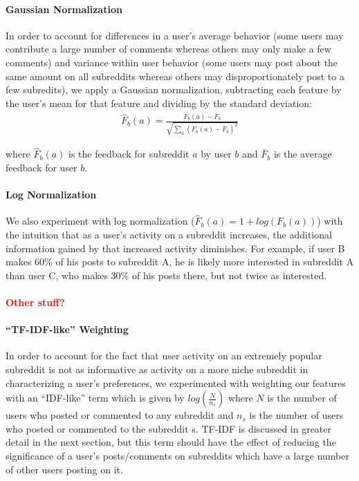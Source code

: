 \documentclass{article}
\begin{document}
\paragraph{Gaussian Normalization} In order to account for differences in a user's average behavior (some users may contribute a large number of comments whereas others may only make a few comments) and variance within user behavior (some users may post about the same amount on all subreddits whereas others may disproportionately post to a few subredits), we apply a Gaussian normalization, subtracting each feature by the user's mean for that feature and dividing by the standard deviation: \begin{align*}
\hat{F}_{b}(a) = \frac{F_{b}(a) - \bar{F}_b}{\sqrt{\sum_{a}{(F_{b}(a) - \bar{F}_b)^2}}}
\end{align*}

where $\hat{F}_{b}(a)$ is the feedback for subreddit $a$ by user $b$ and $\bar{F}_b$ is the average feedback for user $b$.

\paragraph{Log Normalization} We also experiment with log normalization ($\hat{F}_{b}(a) = 1 + log(F_{b}(a))$) with the intuition that as a user's activity on a subreddit increases, the additional information gained by that increased activity diminishes.  For example, if user B makes 60\% of his posts to subreddit A, he is likely more interested in subreddit A than user C, who makes 30\% of his posts there, but not twice as interested.

\paragraph{\textcolor{red}{Other stuff?} }
\paragraph{“TF-IDF-like” Weighting} In order to account for the fact that user activity on an extremely popular subreddit is not as informative as activity on a more niche subreddit in characterizing a user’s preferences, we experimented with weighting our features with an “IDF-like” term which is given by $log(\frac{N}{n_s})$ where $N$ is the number of users who posted or commented to any subreddit and $n_s$ is the number of users who posted or commented to the subreddit s.  TF-IDF is discussed in greater detail in the next section, but this term should have the effect of reducing the significance of a user's posts/comments on subreddits which have a large number of other users posting on it. 
\end{document}
